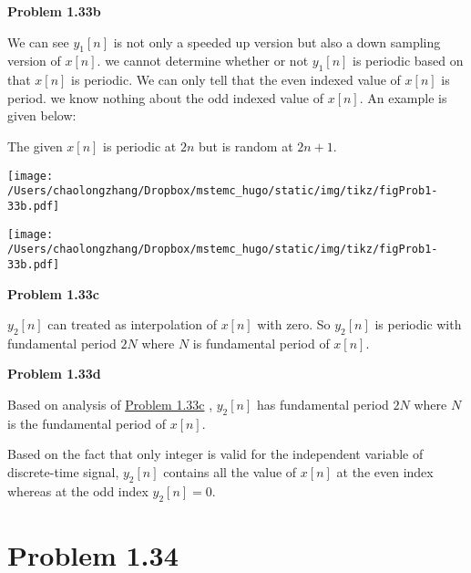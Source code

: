 \documentclass[koma,a4paper,utopia,12pt,listings-color,microtype,paralist,colorlinks,urlcolor=red]{org-article}
\begin{document}
\textbf{Problem 1.33b}

We can see \(y_{1}[n]\) is not only a speeded up version but also a down
sampling version of \(x[n]\). we cannot determine whether or not \(y_{1}[n]\)
is periodic based on that \(x[n]\) is periodic. We can only tell that the even
indexed value of \(x[n]\) is period. we know nothing about the odd indexed value
of \(x[n]\). An example is given below:

The given \(x[n]\) is periodic at \(2n\) but is random at \(2n+1\).
\begin{center}
\texttt{[image: /Users/chaolongzhang/Dropbox/mstemc\_hugo/static/img/tikz/figProb1-33b.pdf]}
\end{center}


\begin{center}
\texttt{[image: /Users/chaolongzhang/Dropbox/mstemc\_hugo/static/img/tikz/figProb1-33b.pdf]}
\end{center}

\textbf{Problem 1.33c} \label{Problem 1.33c}

\(y_{2}[n]\) can treated as interpolation of \(x[n]\) with zero. So \(y_{2}[n]\)
is periodic with fundamental period \(2N\) where \(N\) is fundamental period of
\(x[n]\).

\textbf{Problem 1.33d}

Based on analysis of \hyperref[Problem 1.33c]{Problem 1.33c} , \(y_{2}[n]\) has fundamental period \(2N\)
where \(N\) is the fundamental period of \(x[n]\).

Based on the fact that only integer is valid for the independent variable of
discrete-time signal, \(y_{2}[n]\) contains all the value of \(x[n]\) at the
even index whereas at the odd index \(y_{2}[n]= 0\).
\section{Problem 1.34}
\label{sec:org20cd069}
\end{document}
